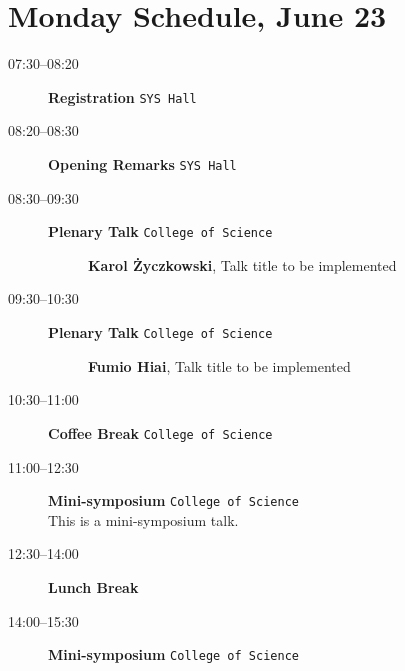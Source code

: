 \documentclass[ILAS2025-program.tex]{subfiles}
\begin{document}
\section{Monday Schedule, June 23}
    
    \begin{description}
    \item[07:30--08:20] \textbf{Registration} {\footnotesize\texttt{SYS Hall}}
    \item[08:20--08:30] \textbf{Opening Remarks} {\footnotesize\texttt{SYS Hall}}
    \item[08:30--09:30] \textbf{Plenary Talk} {\footnotesize\texttt{College of Science}}
    \begin{description}
        \item[] \textbf{Karol Życzkowski}, Talk title to be implemented
        \end{description}
        \item[09:30--10:30] \textbf{Plenary Talk} {\footnotesize\texttt{College of Science}}
    \begin{description}
        \item[] \textbf{Fumio Hiai}, Talk title to be implemented
        \end{description}
        \item[10:30--11:00] \textbf{Coffee Break} {\footnotesize\texttt{College of Science}}
    \item[11:00--12:30] \textbf{Mini-symposium} {\footnotesize\texttt{College of Science}}
    \\This is a mini-symposium talk.\item[12:30--14:00] \textbf{Lunch Break} {\footnotesize\texttt{}}
    \item[14:00--15:30] \textbf{Mini-symposium} {\footnotesize\texttt{College of Science}}
    \\This is a mini-symposium talk.\item[15:30--16:00] \textbf{Coffee Break} {\footnotesize\texttt{College of Science}}
    \item[16:00--17:30] \textbf{Mini-symposium} {\footnotesize\texttt{College of Science}}
    \\This is a mini-symposium talk.\item[17:30--19:30] \textbf{Reception} {\footnotesize\texttt{College of Science}}
    \end{description}
    \newpage

\section{Tuesday Schedule, June 24}
    
\end{document}
